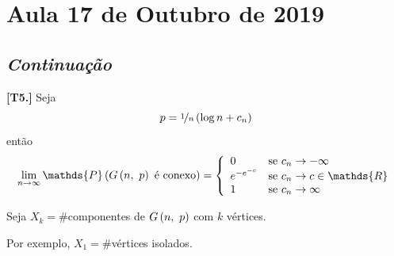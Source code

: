 \section{Aula 17 de Outubro de 2019}
\label{2019_10_17}

\subsection*{\it Continuação}

\begin{teorema}
  \normalfont\textbf{[T5.]}
  Seja
  \vspace*{-\baselineskip}
  \[
    p = \nicefrac{1}{n}\left(\log n + c_n\vphantom{1j}\right)
  \]
  então
  \vspace*{-\baselineskip}
  \[
    \lim_{n\rightarrow\infty} \mathds{P}\left(G\left(n,\ p\vphantom{1j}\right) \text{ é conexo}\vphantom{1j}\right) = \left\{\begin{array}{ll}
      0                               & \text{se } c_n\rightarrow-\infty                            \\
      \mathrel{e}^{-\mathrel{e}^{-c}} & \text{se } c_n\rightarrow c\in\mathds{R}                        \\
      1                               & \text{se } c_n\rightarrow\infty                             \\
    \end{array}\vphantom{1j}\right.
  \]
\end{teorema}

Seja $X_k=\#$componentes de $G\left(n,\ p\vphantom{1j}\right)$ com $k$ vértices.

Por exemplo, $X_1=\#$vértices isolados.


